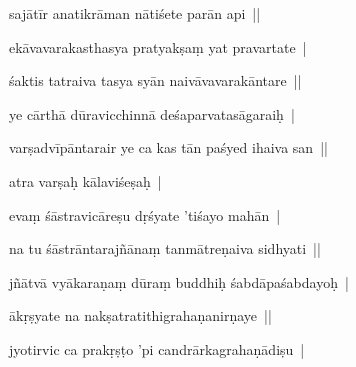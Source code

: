\documentclass[article,12pt,a4paper]{memoir}%
\newcounter{parCount}
\begin{document}
	  \pstart \leavevmode%
	sajātīr anatikrāman nātiśete parān api || 
	{}
	\pend%
      

	  \pstart \leavevmode%
	ekāvavarakasthasya pratyakṣaṃ yat pravartate | 
	{}
	\pend%
      

	  \pstart \leavevmode%
	śaktis tatraiva tasya syān naivāvavarakāntare || 
	{}
	\pend%
      

	  \pstart \leavevmode%
	ye cārthā dūravicchinnā deśaparvatasāgaraiḥ | 
	{}
	\pend%
      

	  \pstart \leavevmode%
	varṣadvīpāntarair ye ca kas tān paśyed ihaiva san || 
	{}
	\pend%
      

	  \pstart \leavevmode%
	atra varṣaḥ kālaviśeṣaḥ | 
	{}
	\pend%
      

	  \pstart \leavevmode%
	evaṃ śāstravicāreṣu dṛśyate 'tiśayo mahān | 
	{}
	\pend%
      

	  \pstart \leavevmode%
	na tu śāstrāntarajñānaṃ tanmātreṇaiva sidhyati || 
	{}
	\pend%
      

	  \pstart \leavevmode%
	jñātvā vyākaraṇaṃ dūraṃ buddhiḥ śabdāpaśabdayoḥ | 
	{}
	\pend%
      

	  \pstart \leavevmode%
	ākṛṣyate na nakṣatratithigrahaṇanirṇaye || 
	{}
	\pend%
      

	  \pstart \leavevmode%
	jyotirvic ca prakṛṣṭo 'pi candrārkagrahaṇādiṣu | 
	{}
	\pend%
      
\end{document}
